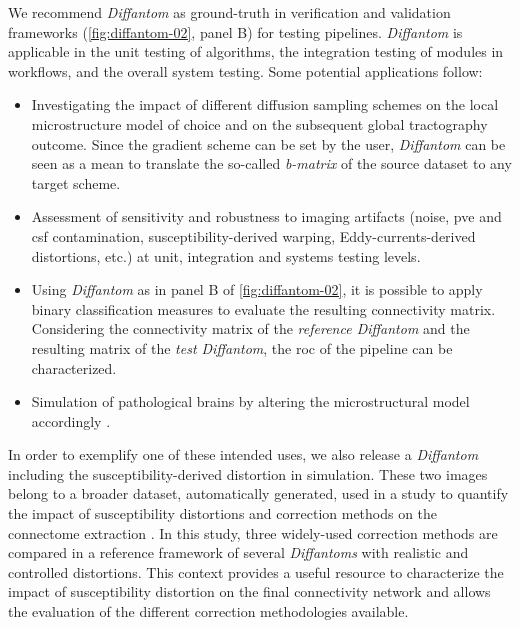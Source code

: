 \documentclass[english]{frontiers/frontiersSCNS} %
\newcommand{\revcomment}[2][]{\ifthenelse{\equal{#1}{}}{}{\todo[size=\tiny]{#1}}%
  \begingroup \color{blue!70} #2\endgroup}
\newcommand{\todo}[2][]{}
\newcommand{\revcomment}[2][]{#2}
\providecommand{\diffantom}{\emph{Diffantom}}
\providecommand{\Diffantom}{\emph{Diffantom}}
\begin{document}
We recommend \diffantom{} as ground-truth in verification and validation frameworks
  (\autoref{fig:diffantom-02}, panel B) for testing pipelines.
\Diffantom{} is applicable in the unit testing of algorithms, the integration testing of
  modules in workflows, and the overall system testing.
Some potential applications follow:
\begin{itemize}
  \item Investigating the impact of different diffusion sampling schemes on the local microstructure
    model of choice and on the subsequent global tractography outcome.
  Since the gradient scheme can be set by the user, \diffantom{} can be seen as a mean to translate the so-called
  \emph{b-matrix} of the source dataset to any target scheme.
  \item Assessment of sensitivity and robustness to imaging artifacts (noise, \acrlong{pve} and \gls*{csf} contamination,
    susceptibility-derived warping, Eddy-currents-derived distortions, etc.) at unit, integration and systems testing levels.
  \item Using \diffantom{} as in panel B of \autoref{fig:diffantom-02}, it is possible to apply binary classification measures
    to evaluate the resulting connectivity matrix.
  Considering the connectivity matrix of the \emph{reference Diffantom} and the resulting
    matrix of the \emph{test Diffantom}, the \acrfull*{roc} of the pipeline can be characterized.
  \item Simulation of pathological brains by altering the microstructural
    model accordingly \cite[e.g. as tumors were simulated in][]{kaus_simulation_2000}.
\end{itemize}
In order to exemplify one of these intended uses, we also release a \diffantom{} including the susceptibility-derived
  distortion in simulation.
\revcomment[Rev.\#1\\Q14.2]{%
These two images belong to a broader dataset, automatically generated, used in a study to quantify
  the impact of susceptibility distortions and correction methods on the connectome extraction
  \cite[Chapter 5]{esteban_image_2015}.
In this study, three widely-used correction methods are compared in a reference framework of
  several \emph{Diffantoms} with realistic and controlled distortions.
This context provides a useful resource to characterize the impact of susceptibility distortion
  on the final connectivity network and allows the evaluation of the different correction
  methodologies available.%
}
\end{document}
